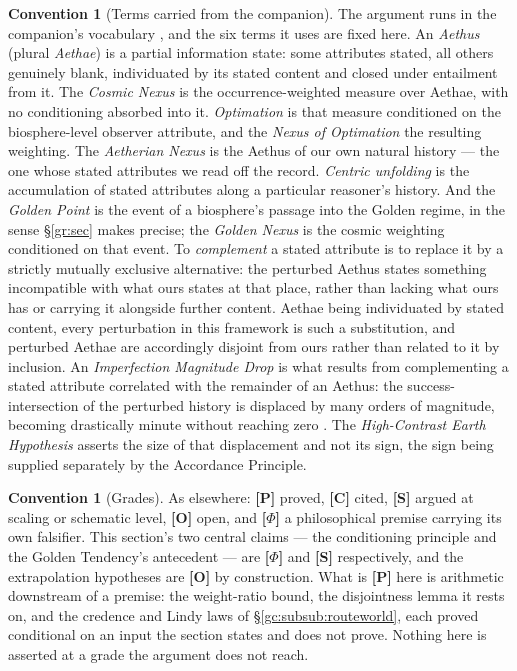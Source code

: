 \documentclass[11pt]{article}
\numberwithin{equation}{section}
\theoremstyle{plain}
\theoremstyle{definition}
\newtheorem{convention}[theorem]{Convention}
\theoremstyle{remark}
\begin{document}
\begin{convention}[Terms carried from the companion]\label{gc:conv:vocab}
The argument runs in the companion's vocabulary
\cite{Nexus, Ben26Found}, and the six terms it uses are fixed here.
An \emph{Aethus} (plural \emph{Aethae}) is a partial information state:
some attributes stated, all others genuinely blank, individuated by its
stated content and closed under entailment from it. The \emph{Cosmic
Nexus} is the occurrence-weighted measure over Aethae, with no
conditioning absorbed into it. \emph{Optimation} is that measure
conditioned on the biosphere-level observer attribute, and the
\emph{Nexus of Optimation} the resulting weighting. The
\emph{Aetherian Nexus} is the Aethus of our own natural history ---
the one whose stated attributes we read off the record. \emph{Centric
unfolding} is the accumulation of stated attributes along a
particular reasoner's history. And the \emph{Golden Point} is the event
of a biosphere's passage into the Golden regime, in the sense
\S\ref{gr:sec} makes precise; the \emph{Golden Nexus} is the cosmic
weighting conditioned on that event.
To \emph{complement} a stated attribute is to replace it by a
strictly mutually exclusive alternative: the perturbed Aethus states
something incompatible with what ours states at that place, rather than
lacking what ours has or carrying it alongside further content. Aethae
being individuated by stated content, every perturbation in this
framework is such a substitution, and perturbed Aethae are accordingly
disjoint from ours rather than related to it by inclusion. An
\emph{Imperfection Magnitude Drop} is what results from complementing a
stated attribute correlated with the remainder of an Aethus: the
success-intersection of the perturbed history is displaced by many
orders of magnitude, becoming drastically minute without reaching zero
\cite[\S IMD]{Nexus}. The \emph{High-Contrast Earth Hypothesis} asserts
the size of that displacement and not its sign, the sign being supplied
separately by the Accordance Principle.
\end{convention}

\begin{convention}[Grades]\label{gc:conv:grades}
As elsewhere: \textbf{[P]} proved, \textbf{[C]} cited, \textbf{[S]}
argued at scaling or schematic level, \textbf{[O]} open, and
\textbf{[$\Phi$]} a philosophical premise carrying its own falsifier.
This section's two central claims --- the conditioning principle and the
Golden Tendency's antecedent --- are \textbf{[$\Phi$]} and \textbf{[S]}
respectively, and the extrapolation hypotheses are \textbf{[O]} by
construction. What is \textbf{[P]} here is arithmetic downstream of a
premise: the weight-ratio bound, the disjointness lemma it rests on, and
the credence and Lindy laws of \S\ref{gc:subsub:routeworld}, each proved
conditional on an input the section states and does not prove. Nothing
here is asserted at a grade the argument does not reach.
\end{convention}
\end{document}

